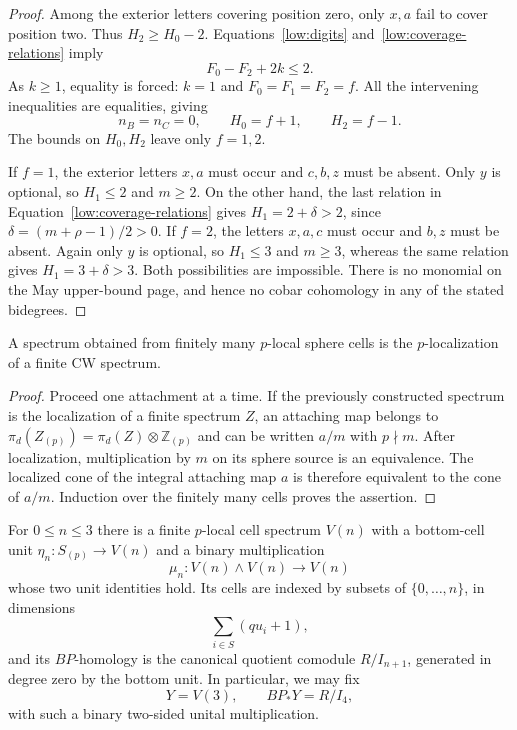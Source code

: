 \begin{proof}
Among the exterior letters covering position zero, only $x,a$ fail to
cover position two.  Thus $H_2\geq H_0-2$.  Equations~\eqref{low:digits}
and~\eqref{low:coverage-relations} imply
\[
 F_0-F_2+2k\leq2.
\]
As $k\geq1$, equality is forced: $k=1$ and
$F_0=F_1=F_2=f$.  All the intervening inequalities are equalities, giving
\[
 n_B=n_C=0,\qquad H_0=f+1,\qquad H_2=f-1.
\]
The bounds on $H_0,H_2$ leave only $f=1,2$.

If $f=1$, the exterior letters $x,a$ must occur and $c,b,z$ must be
absent.  Only $y$ is optional, so $H_1\leq2$ and $m\geq2$.  On the other
hand, the last relation in Equation~\eqref{low:coverage-relations} gives
$H_1=2+\delta>2$, since
$\delta=(m+\rho-1)/2>0$.  If $f=2$, the letters $x,a,c$ must occur and
$b,z$ must be absent.  Again only $y$ is optional, so $H_1\leq3$ and
$m\geq3$, whereas the same relation gives $H_1=3+\delta>3$.
Both possibilities are impossible.  There is no monomial on the May
upper-bound page, and hence no cobar cohomology in any of the stated
bidegrees.
\end{proof}

\begin{lemma}
\label{low:finite-localization}
A spectrum obtained from finitely many $p$-local sphere cells is the
$p$-localization of a finite CW spectrum.
\end{lemma}

\begin{proof}
Proceed one attachment at a time.  If the previously constructed spectrum
is the localization of a finite spectrum $Z$, an attaching map belongs to
$\pi_d(Z_{(p)})=\pi_d(Z)\otimes\mathbb Z_{(p)}$ and can be written $a/m$
with $p\nmid m$.  After localization, multiplication by $m$ on its sphere
source is an equivalence.  The localized cone of the integral attaching
map $a$ is therefore equivalent to the cone of $a/m$.  Induction over
the finitely many cells proves the assertion.
\end{proof}

\begin{proposition}
\label{low:V3}
For $0\leq n\leq3$ there is a finite $p$-local cell spectrum $V(n)$ with
a bottom-cell unit $\eta_n:S_{(p)}\to V(n)$ and a binary multiplication
\[
 \mu_n:V(n)\wedge V(n)\longrightarrow V(n)
\]
whose two unit identities hold.  Its cells are indexed by subsets of
$\{0,\ldots,n\}$, in dimensions
\begin{equation}
 \sum_{i\in S}(qu_i+1),
 \label{low:cell-dimensions}
\end{equation}
and its $BP$-homology is the canonical quotient comodule $R/I_{n+1}$,
generated in degree zero by the bottom unit.  In particular, we may fix
\begin{equation}
 Y=V(3),\qquad BP_*Y=R/I_4,
 \label{low:Y}
\end{equation}
with such a binary two-sided unital multiplication.
\end{proposition}

